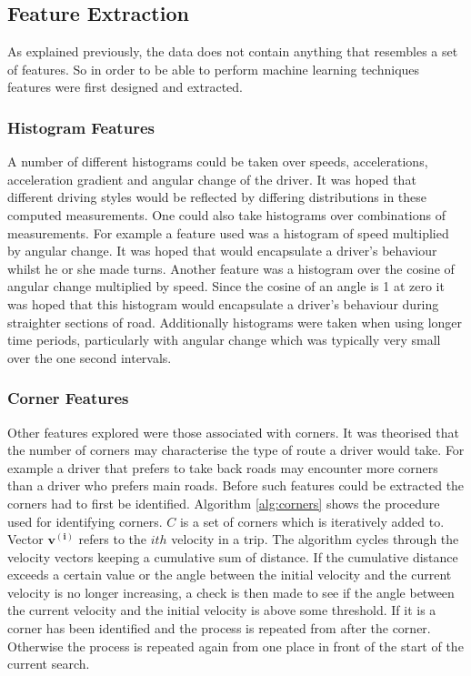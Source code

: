 \documentclass[a4paper, 11pt, twocolumn]{report}
\begin{document}
\subsection{Feature Extraction}
As explained previously, the data does not contain anything that resembles a set of features.
So in order to be able to perform machine learning techniques features were first designed and extracted.

\subsubsection{Histogram Features}
A number of different histograms could be taken over speeds, accelerations, acceleration gradient and angular change of the driver.
It was hoped that different driving styles would be reflected by differing distributions in these computed measurements.
One could also take histograms over combinations of measurements.
For example a feature used was a histogram of speed multiplied by angular change. It was hoped that would encapsulate a driver's behaviour whilst he or she made turns.
Another feature was a histogram over the cosine of angular change multiplied by speed.
Since the cosine of an angle is 1 at zero it was hoped that this histogram would encapsulate a driver's behaviour during straighter sections of road.
Additionally histograms were taken when using longer time periods, particularly with angular change which was typically very small over the one second intervals.

\subsubsection{Corner Features}
Other features explored were those associated with corners.
It was theorised that the number of corners may characterise the type of route a driver would take. For example a driver that prefers to take back roads may encounter more corners than a driver who prefers main roads.
Before such features could be extracted the corners had to first be identified.
Algorithm \ref{alg:corners} shows the procedure used for identifying corners.
$C$ is a set of corners which is iteratively added to.
Vector $\mathbf{v^{(i)}}$ refers to the $ith$ velocity in a trip.
The algorithm cycles through the velocity vectors keeping a cumulative sum of distance.
If the cumulative distance exceeds a certain value or the angle between the initial velocity and the current velocity is no longer increasing, a check is then made to see if the angle between the current velocity and the initial velocity is above some threshold.
If it is a corner has been identified and the process is repeated from after the corner.
Otherwise the process is repeated again from one place in front of the start of the current search.
\end{document}
